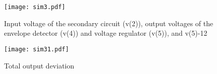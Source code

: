 \begin{figure}[h!] \centering
\texttt{[image: sim3.pdf]}
\caption{Input voltage of the secondary circuit (v(2)), output voltages of the envelope detector (v(4)) and voltage regulator (v(5)), and v(5)-12}
\end{figure}

\begin{figure}[h!] \centering
\texttt{[image: sim31.pdf]}
\caption{Total output deviation}
\end{figure}
